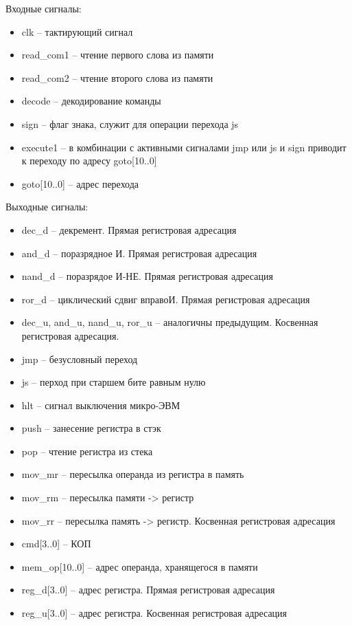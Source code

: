 Входные сигналы:
\begin{itemize}
    \item clk -- тактирующий сигнал
    \item read\_com1 -- чтение первого слова из памяти
    \item read\_com2 -- чтение второго слова из памяти
    \item decode -- декодирование команды
    \item sign -- флаг знака, служит для операции перехода js
    \item execute1 -- в комбинации с активными сигналами jmp или js и sign приводит к переходу по адресу goto[10..0]
    \item goto[10..0] -- адрес перехода
\end{itemize}
Выходные сигналы:
\begin{itemize}
    \item dec\_d -- декремент. Прямая регистровая адресация
    \item and\_d -- поразрядное И. Прямая регистровая адресация
    \item nand\_d -- поразрядое И-НЕ. Прямая регистровая адресация
    \item ror\_d -- циклический сдвиг вправоИ. Прямая регистровая адресация
    \item dec\_u, and\_u, nand\_u, ror\_u -- аналогичны предыдущим. Косвенная регистровая адресация.
    \item jmp -- безусловный переход
    \item js -- перход при старшем бите равным нулю
    \item hlt -- сигнал выключения микро-ЭВМ
    \item push -- занесение регистра в стэк
    \item pop -- чтение регистра из стека
    \item mov\_mr -- пересылка операнда из регистра в память
    \item mov\_rm -- пересылка памяти -> регистр
    \item mov\_rr -- пересылка память -> регистр. Косвенная регистровая адресация
    \item cmd[3..0] -- КОП
    \item mem\_op[10..0] -- адрес операнда, хранящегося в памяти
    \item reg\_d[3..0] -- адрес регистра. Прямая регистровая адресация
    \item reg\_u[3..0] -- адрес регистра. Косвенная регистровая адресация
\end{itemize}

